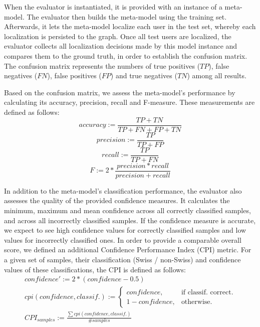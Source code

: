\documentclass[10pt,a4paper]{article}
\begin{document}
When the evaluator is instantiated, it is provided with an instance of a meta-model. The evaluator then builds the meta-model using the training set. Afterwards, it lets the meta-model localize each user in the test set, whereby each localization is persisted to the graph. Once all test users are localized, the evaluator collects all localization decisions made by this model instance and compares them to the ground truth, in order to establish the confusion matrix. The confusion matrix represents the numbers of true positives ($TP$), false negatives ($FN$), false positives ($FP$) and true negatives ($TN$) among all results.

Based on the confusion matrix, we assess the meta-model's performance by calculating its accuracy, precision, recall and F-measure. These measurements are defined as follows:
\begin{equation}
accuracy := \frac{TP+TN}{TP+FN+FP+TN}
\end{equation}
\begin{equation}
precision := \frac{TP}{TP+FP}
\end{equation}
\begin{equation}
recall := \frac{TP}{TP+FN}
\end{equation}
\begin{equation}
F := 2*\frac{precision * recall}{precision + recall}
\end{equation}

In addition to the meta-model's classification performance, the evaluator also assesses the quality of the provided confidence measures. It calculates the minimum, maximum and mean confidence across all correctly classified samples, and across all incorrectly classified samples. If the confidence measure is accurate, we expect to see high confidence values for correctly classified samples and low values for incorrectly classified ones. In order to provide a comparable overall score, we defined an additional Confidence Performance Index (CPI) metric. For a given set of samples, their classification (Swiss / non-Swiss) and confidence values of these classifications, the CPI is defined as follows:
\begin{equation}
\begin{split}
confidence' := 2*(confidence-0.5) \\
cpi(confidence, classif.) := \begin{cases}
    confidence, & \text{if classif. correct}.\\
    1-confidence, & \text{otherwise}.
  \end{cases} \\
CPI_{samples} := \frac{\sum cpi(confidence, classif.)}{\#samples}
\end{split}
\end{equation}
\end{document}
